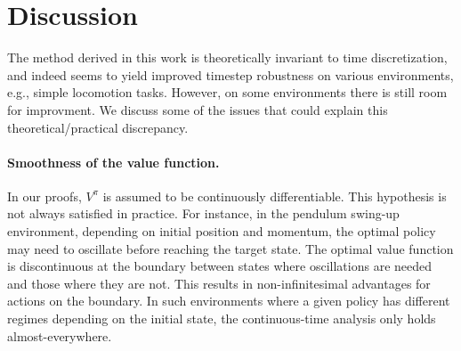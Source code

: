 \section{Discussion}
\label{sec:discussions}

The method derived in this work is theoretically invariant to time
discretization, and
indeed seems to yield improved timestep robustness
on various environments, e.g.,
simple locomotion tasks.  However, on some environments there is still
room for improvment. We discuss some of the issues
that could explain this theoretical/practical discrepancy.

\paragraph{Smoothness of the value function.} In our proofs, $V^\pi$ is
assumed to be continuously differentiable.  This %
hypothesis is not always satisfied in practice. 
For instance, in the pendulum swing-up environment, depending on initial
position and momentum, the optimal policy may need to oscillate before
reaching the target state. The optimal value
function is discontinuous at the boundary between states where
oscillations are needed and those where they are not.
This results in non-infinitesimal advantages
for actions on the boundary. In such environments where a given policy
has different regimes depending on the initial state, the continuous-time
analysis only holds almost-everywhere.

